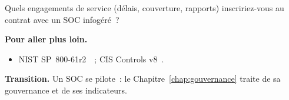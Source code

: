 \begin{boxexo}[title={\ding{45}\quad Exercice~2.10. Convention de service \niveauexpert}]
Quels engagements de service (délais, couverture, rapports) inscririez-vous
au contrat avec un SOC infogéré~?
\end{boxexo}

\bigskip

\begin{boxinfo}
\textbf{Pour aller plus loin.}
\begin{itemize}
    \item NIST SP~800-61r2~\cite{nist80061r2}~; CIS Controls v8~\cite{cis2021controls}.
\end{itemize}
\end{boxinfo}

\begin{boxinfo}
\textbf{Transition.} Un SOC se pilote~: le Chapitre~\ref{chap:gouvernance}
traite de sa gouvernance et de ses indicateurs.
\end{boxinfo}
